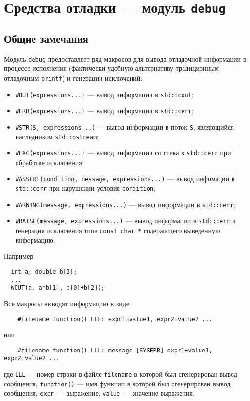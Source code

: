 \section{Средства отладки --- модуль {\tt debug}}
\subsection{Общие замечания}
Модуль \verb'debug' предоставляет ряд макросов для вывода отладочной информации в процессе исполнения
(фактически удобную альтернативу традиционным отладочным \verb'printf') и генерации исключений:
\begin{itemize}
  \item\verb'WOUT(expressions...)' --- вывод информации в \verb'std::cout';
  \item\verb'WERR(expressions...)' --- вывод информации в \verb'std::cerr';
  \item\verb'WSTR(S, expressions...)' --- вывод информации в поток \verb'S', являющийся наследником \verb'std::ostream';
  \item\verb'WEXC(expressions...)' --- вывод информации со стека в \verb'std::cerr' при обработке исключения; 
  \item\verb'WASSERT(condition, message, expressions...)' --- вывод инфомации в \verb'std::cerr'
    при нарушении условия \verb'condition';
  \item\verb'WARNING(message, expressions...)' --- вывод информации в \verb'std::cerr';
  \item\verb'WRAISE(message, expressions...)' --- вывод информации в \verb'std::cerr'
    и генерация исключения типа \verb'const char *' содержащего выведенную информацию.
\end{itemize}
Например
\begin{verbatim}
  int a; double b[3];
  ...
  WOUT(a, a*b[1], b[0]+b[2]);
\end{verbatim}

Все макросы выводят информацию в виде
\begin{verbatim}
    #filename function() LLL: expr1=value1, expr2=value2 ...
\end{verbatim}
или
\begin{verbatim}
    #filename function() LLL: message [SYSERR] expr1=value1, expr2=value2 ...
\end{verbatim}
где \verb'LLL' --- номер строки в файле \verb'filename' в которой был сгенерирован вывод сообщения,
\verb'function()' --- имя функции в которой был сгенерирован вывод сообщения, \verb'expr'~--- выражение,
\verb'value'~--- значение выражения.

